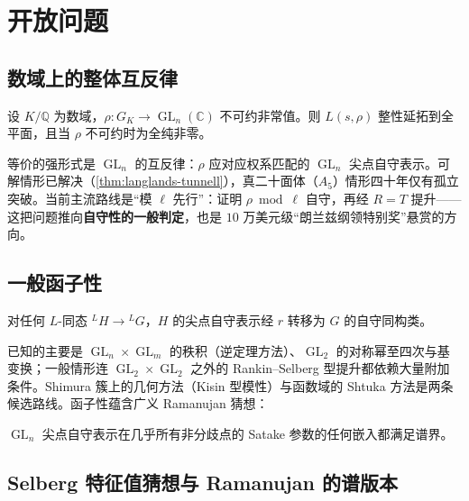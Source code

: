 \section{开放问题}\label{sec:open_problems}

\subsection{数域上的整体互反律}

\begin{conjecture}[广义 Artin 猜想]\label{conj:artin}
    设 $K/\mathbb{Q}$ 为数域，$\rho: G_K \to \operatorname{GL}_n(\mathbb{C})$ 不可约非常值。则 $L(s,\rho)$ 整性延拓到全平面，且当 $\rho$ 不可约时为全纯非零。
\end{conjecture}

等价的强形式是 $\operatorname{GL}_n$ 的互反律：$\rho$ 应对应权系匹配的 $\operatorname{GL}_n$ 尖点自守表示。可解情形已解决（\cref{thm:langlands-tunnell}），真二十面体（$A_5$）情形四十年仅有孤立突破。当前主流路线是“模 $\ell$ 先行”：证明 $\rho \bmod \ell$ 自守，再经 $R=T$ 提升——这把问题推向\textbf{自守性的一般判定}，也是 $10$ 万美元级“朗兰兹纲领特别奖”悬赏的方向。

\subsection{一般函子性}

\begin{conjecture}[函子性]\label{conj:functoriality}
    对任何 $L$-同态 $^LH \to {}^LG$，$H$ 的尖点自守表示经 $r$ 转移为 $G$ 的自守同构类。
\end{conjecture}

已知的主要是 $\operatorname{GL}_n \times \operatorname{GL}_m$ 的秩积（逆定理方法）、$\operatorname{GL}_2$ 的对称幂至四次\cite{kimshahidi2002}与基变换；一般情形连 $\operatorname{GL}_2 \times \operatorname{GL}_2$ 之外的 Rankin--Selberg 型提升都依赖大量附加条件。Shimura 簇上的几何方法（Kisin 型模性）与函数域的 Shtuka 方法是两条候选路线。函子性蕴含广义 Ramanujan 猜想：

\begin{conjecture}[广义 Ramanujan 猜想]
    $\operatorname{GL}_n$ 尖点自守表示在几乎所有非分歧点的 Satake 参数的任何嵌入都满足谱界。
\end{conjecture}

\subsection{Selberg 特征值猜想与 Ramanujan 的谱版本}

